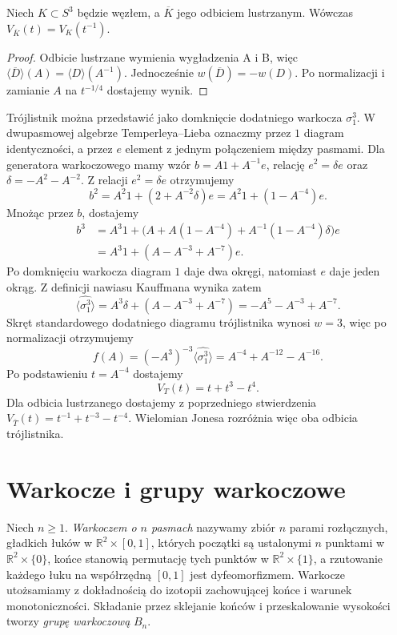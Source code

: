 \begin{stwierdzenie}
Niech $K\subset S^3$ będzie węzłem, a $\overline K$ jego
odbiciem lustrzanym. Wówczas
$V_{\overline K}(t)=V_K(t^{-1})$.
\end{stwierdzenie}

\begin{proof}
Odbicie lustrzane wymienia wygładzenia A i B, więc
$\langle\overline D\rangle(A)=\langle D\rangle(A^{-1})$.
Jednocześnie $w(\overline D)=-w(D)$.
Po normalizacji i zamianie $A$ na $t^{-1/4}$ dostajemy wynik.
\end{proof}

\begin{przyklad}
Trójlistnik można przedstawić jako domknięcie dodatniego warkocza
$\sigma_1^3$. W dwupasmowej algebrze Temperleya--Lieba oznaczmy przez
$1$ diagram identyczności, a przez $e$ element z jednym połączeniem
między pasmami. Dla generatora warkoczowego mamy wzór
$b=A1+A^{-1}e$, relację $e^2=\delta e$ oraz
$\delta=-A^2-A^{-2}$.
Z relacji $e^2=\delta e$ otrzymujemy
\[
b^2=A^2 1+(2+A^{-2}\delta)e
=A^2 1+(1-A^{-4})e.
\]
Mnożąc przez $b$, dostajemy
\[
\begin{aligned}
b^3
&=A^3 1+
\bigl(A+A(1-A^{-4})+A^{-1}(1-A^{-4})\delta\bigr)e\\
&=A^3 1+(A-A^{-3}+A^{-7})e.
\end{aligned}
\]
Po domknięciu warkocza diagram $1$ daje dwa okręgi, natomiast
$e$ daje jeden okrąg. Z definicji nawiasu Kauffmana wynika zatem
\[
\langle\widehat{\sigma_1^3}\rangle
=A^3\delta+(A-A^{-3}+A^{-7})
=-A^5-A^{-3}+A^{-7}.
\]
Skręt standardowego dodatniego diagramu trójlistnika wynosi $w=3$,
więc po normalizacji otrzymujemy
\[
f(A)=(-A^3)^{-3}\langle\widehat{\sigma_1^3}\rangle
=A^{-4}+A^{-12}-A^{-16}.
\]
Po podstawieniu $t=A^{-4}$ dostajemy
\[
V_T(t)=t+t^3-t^4.
\]
Dla odbicia lustrzanego dostajemy z poprzedniego stwierdzenia
$V_{\overline T}(t)=t^{-1}+t^{-3}-t^{-4}$. Wielomian Jonesa
rozróżnia więc oba odbicia trójlistnika.
\end{przyklad}

\section{Warkocze i grupy warkoczowe}
\label{sec:kt-warkocze}

\begin{definicja}
Niech $n\geq1$. \emph{Warkoczem o $n$ pasmach} nazywamy
zbiór $n$ parami rozłącznych, gładkich łuków w
$\mathbb R^2\times[0,1]$, których początki są ustalonymi
$n$ punktami w $\mathbb R^2\times\{0\}$, końce stanowią
permutację tych punktów w $\mathbb R^2\times\{1\}$,
a rzutowanie każdego łuku na współrzędną $[0,1]$
jest dyfeomorfizmem. Warkocze utożsamiamy z dokładnością
do izotopii zachowującej końce i warunek monotoniczności.
Składanie przez sklejanie końców i przeskalowanie wysokości
tworzy \emph{grupę warkoczową} $B_n$.
\end{definicja}

